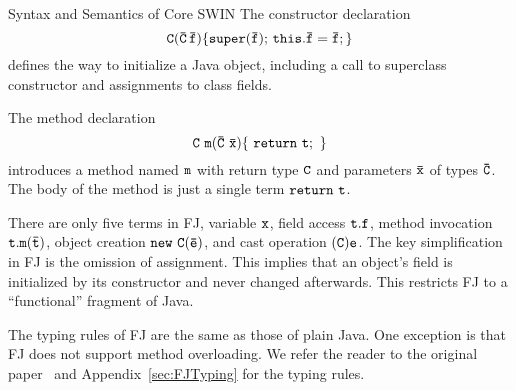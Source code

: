 \begin{section}{Syntax and Semantics of Core SWIN}
The constructor declaration 
\[
\tt C(\bar{C}\,\bar{f})\{super(\bar{f});\,this.\bar{f}=\bar{f};\}
\]
defines the way to initialize a Java object, including a call to superclass constructor and assignments to class fields.

The method declaration 
\[
\tt C\ m(\bar{C}\ \bar{x})\{\ return\ t;\ \}
\]
introduces a method named $\tt m$ with return type $\tt C$ and
parameters $\tt \bar{x}$ of types $\tt\bar{C}$. The body of the method
is just a single term $\tt return\ t$.

There are only five terms in FJ, variable $\tt x$, field access $\tt
t.f$, method invocation $\tt t.m(\bar{t})$, object creation $\tt new\ 
C(\bar{e})$, and cast operation $\tt (C)e$. 
The  key
simplification in FJ is the omission of assignment. This implies that
an object's field is initialized by its constructor and never
changed afterwards. This restricts FJ to a ``functional'' fragment of
Java.

The typing rules of FJ are the same as those of plain
Java. One exception is that FJ does not support method
overloading. We refer the reader to the original paper~\cite{fj} and
Appendix~\ref{sec:FJTyping} for the typing rules. 





\end{section}
